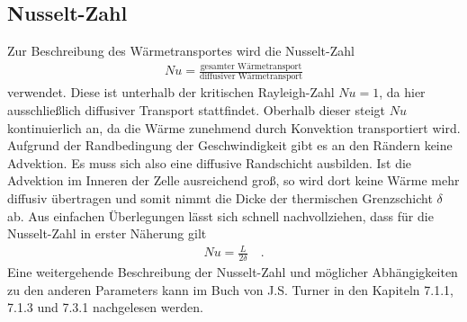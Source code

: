 \documentclass[12pt,a4paper,titlepage,headinclude]{scrartcl}
\numberwithin{equation}{subsection}
\begin{document}
\subsection{Nusselt-Zahl}
Zur Beschreibung des Wärmetransportes wird die Nusselt-Zahl
\begin{align*}
	Nu=\frac{\text{gesamter Wärmetransport}}{\text{diffusiver Wärmetransport}}
\end{align*}
verwendet.
Diese ist unterhalb der kritischen Rayleigh-Zahl $Nu=1$, da hier ausschließlich diffusiver Transport stattfindet.
Oberhalb dieser steigt $Nu$ kontinuierlich an, da die Wärme zunehmend durch Konvektion transportiert wird.
Aufgrund der Randbedingung der Geschwindigkeit gibt es an den Rändern keine Advektion.
Es muss sich also eine diffusive Randschicht ausbilden.
Ist die Advektion im Inneren der Zelle ausreichend groß, so wird dort keine Wärme mehr diffusiv übertragen und somit nimmt die Dicke der thermischen Grenzschicht $\delta$ ab.
Aus einfachen Überlegungen lässt sich schnell nachvollziehen, dass für die Nusselt-Zahl in erster Näherung gilt
\begin{align}
	Nu=\frac{L}{2\delta}\quad.
\end{align}
Eine weitergehende Beschreibung der Nusselt-Zahl und möglicher Abhängigkeiten zu den anderen Parameters kann im Buch von J.S. Turner \cite{Bef} in den Kapiteln 7.1.1, 7.1.3 und 7.3.1 nachgelesen werden.
\end{document}

